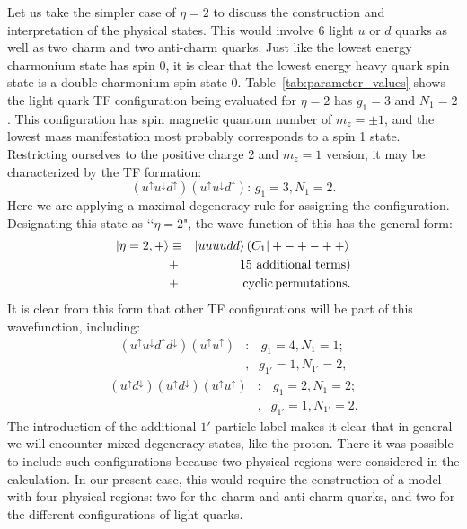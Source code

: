 \documentclass[final,3p,times,twocolumn]{elsarticle}
\begin{document}
    Let us take the simpler case of $\eta=2$ to discuss the construction and interpretation of the physical states. This would involve 6 light $u$ or $d$ quarks as well as two charm and two anti-charm quarks. Just like the lowest energy charmonium state has spin 0, it is clear that the lowest energy heavy quark spin state is a double-charmonium spin state 0. Table~\ref{tab:parameter_values} shows the light quark TF configuration being evaluated for $\eta=2$ has $g_1=3$ and $N_1=2$. This configuration has spin magnetic quantum number of $m_z=\pm 1$, and the lowest mass manifestation most probably corresponds to a spin 1 state. Restricting ourselves to the positive charge 2 and $m_z=1$ version, it may be characterized by the TF formation:
    \begin{equation*}
    (u^{\uparrow}u^{\downarrow}d^{\uparrow})(u^{\uparrow}u^{\downarrow}d^{\uparrow}): \, g_1=3, N_1=2.
    \end{equation*}
    Here we are applying a maximal degeneracy rule for assigning the configuration. Designating this state as \lq\lq $\eta=2$", the wave function of this has the general form:
    \begin{eqnarray}
        |\eta=2,+\rangle &\equiv& |uuuudd\rangle \left(C_1|+-+-++\rangle \right. \nonumber \\
        &+& \left. \text{ 15 additional terms}\right) \nonumber\\
        &+&{\rm cyclic\, permutations}.\label{proton}
    \end{eqnarray}
    It is clear from this form that other TF configurations will be part of this wavefunction, including:
    \begin{eqnarray*}
        (u^{\uparrow}u^{\downarrow}d^{\uparrow}d^{\downarrow})(u^{\uparrow}u^{\uparrow})&:& \, g_1=4, N_1=1;\\ &,& g_{1'}=1, N_{1'}=2,
    \end{eqnarray*}
    \begin{eqnarray*}
        (u^{\uparrow}d^{\downarrow})(u^{\uparrow}d^{\downarrow})(u^{\uparrow}u^{\uparrow})&:& \, g_1=2, N_1=2;\\ &,& g_{1'}=1,N_{1'}=2. 
    \end{eqnarray*}
    The introduction of the additional $1'$ particle label makes it clear that in general we will encounter mixed degeneracy states, like the proton. There it was possible to include such configurations because two physical regions were considered in the calculation. In our present case, this would require the construction of a model with four physical regions: two for the charm and anti-charm quarks, and two for the different configurations of light quarks.
    
\end{document}
